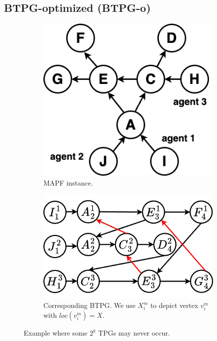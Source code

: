 \documentclass[letterpaper]{article} %
\theoremstyle{definition}
\begin{document}
\subsection{BTPG-optimized (BTPG-o)}

\begin{figure}[t]
    \begin{subfigure}[a]{0.4\linewidth}
         \centering
         \includegraphics[width=0.87\linewidth]{Figs/examplePath.png}
         \caption{MAPF instance.}
         \label{fig: example path}
     \end{subfigure}
     \hfill
     \begin{subfigure}[a]{0.59\linewidth}
         \centering
         \includegraphics[width=.9\linewidth]{Figs/exampleBTPG.png}
         \caption{Corresponding BTPG. We use $X_i^m$ to depict vertex $v_i^m$ with $loc(v_i^m)=X$.}
         \label{fig: example BTPG}
     \end{subfigure}

     \caption{Example where some $2^k$ TPGs may never occur.}\label{fig:counter-example}
\end{figure}
\end{document}
